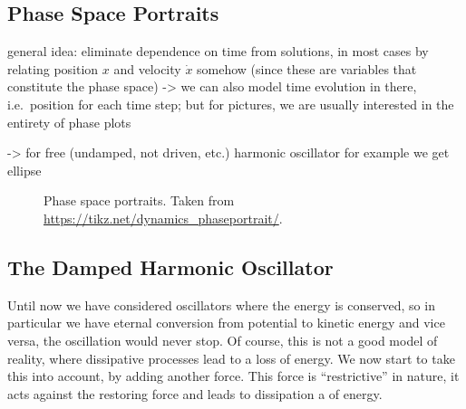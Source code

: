 \documentclass[../class_mech_main.tex]{subfiles}
\begin{document}
		\subsection{Phase Space Portraits}
general idea: eliminate dependence on time from solutions, in most cases by relating position $x$ and velocity $\dot{x}$ somehow (since these are variables that constitute the phase space) -> we can also model time evolution in there, i.e.~position for each time step; but for pictures, we are usually interested in the entirety of phase plots

-> for free (undamped, not driven, etc.) harmonic oscillator for example we get ellipse



\begin{figure}
	\centering




	\caption{Phase space portraits. Taken from \url{https://tikz.net/dynamics_phaseportrait/}.}
	\label{fig:harm_osc_phase_space}
\end{figure}



		\subsection{The Damped Harmonic Oscillator}
Until now we have considered oscillators where the energy is conserved, so in particular we have eternal conversion from potential to kinetic energy and vice versa, the oscillation would never stop. Of course, this is not a good model of reality, where dissipative processes lead to a loss of energy. We now start to take this into account, by adding another force. This force is \enquote{restrictive} in nature, it acts against the restoring force and leads to dissipation a of energy.
\end{document}
